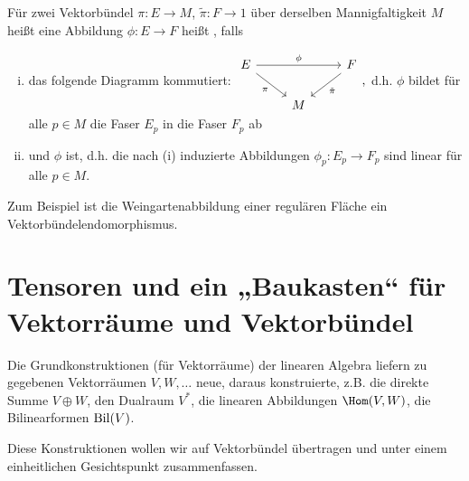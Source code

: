 \begin{df} \label{5.8}
    Für zwei Vektorbündel $\pi: E \to M$, $\tilde \pi: F \to 1$ über derselben Mannigfaltigkeit $M$ heißt eine Abbildung $\phi: E \to F$ heißt , falls
    \begin{enumerate}[(i)]
        \item
            das folgende Diagramm kommutiert:
            \begin{math}
                \begin{tikzcd}
                    E \ar[rr,"\phi"] \ar[rd,"\pi"'] & & F \ar[ld,"\tilde \pi"] \\
                    & M
                \end{tikzcd},
            \end{math}
            d.h. $\phi$ bildet für alle $p \in M$ die Faser $E_p$ in die Faser $F_p$ ab
        \item
            und $\phi$  ist, d.h. die nach (i) induzierte Abbildungen $\phi_p: E_p \to F_p$ sind linear für alle $p \in M$.
    \end{enumerate}
    \begin{note}
        Zum Beispiel ist die Weingartenabbildung einer regulären Fläche ein Vektorbündelendomorphismus.
    \end{note}
\end{df}


\section[Tensoren]{Tensoren und ein „Baukasten“ für Vektorräume und Vektorbündel}

Die Grundkonstruktionen (für Vektorräume) der linearen Algebra liefern zu gegebenen Vektorräumen $V, W, \dotsc$ neue, daraus konstruierte, z.B. die direkte Summe $V \oplus W$, den Dualraum $V^*$, die linearen Abbildungen $\Hom(V,W)$, die Bilinearformen $\operatorname{Bil}(V)$.

Diese Konstruktionen wollen wir auf Vektorbündel übertragen und unter einem einheitlichen Gesichtspunkt zusammenfassen.


